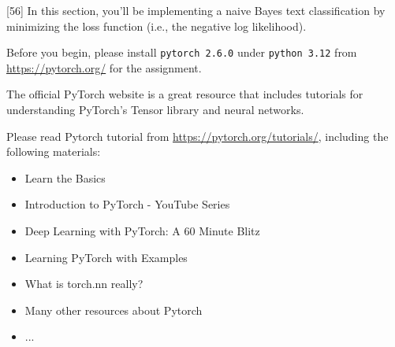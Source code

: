 [56]
In this section, you'll be implementing a naive Bayes text classification by minimizing the loss function (i.e., the negative log likelihood). 

Before you begin, please install \texttt{pytorch 2.6.0} under \texttt{python 3.12} from \url{https://pytorch.org/} for the assignment. 

The official PyTorch website is a great resource that includes tutorials for understanding PyTorch's Tensor library and neural networks. \newline

 Please read Pytorch tutorial from  \url{https://pytorch.org/tutorials/}, including the following materials:
\begin{itemize}
        \item Learn the Basics
        \item Introduction to PyTorch - YouTube Series
        \item Deep Learning with PyTorch: A 60 Minute Blitz
        \item Learning PyTorch with Examples
        \item What is torch.nn really?
        \item Many other resources about Pytorch 
        \item ...
\end{itemize}

